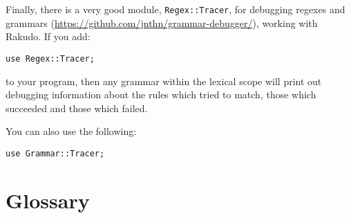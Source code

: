 Finally, there is a very good module, \verb'Regex::Tracer', for 
debugging regexes and grammars (\url{https://github.com/jnthn/grammar-debugger/}), working with Rakudo. If you add:

\begin{verbatim}
use Regex::Tracer;
\end{verbatim}

to your program, then any grammar within the lexical scope will 
print out debugging information about the rules which tried to 
match, those which succeeded and those which failed.

You can also use the following:

\begin{verbatim}
use Grammar::Tracer;
\end{verbatim}


\section{Glossary}

